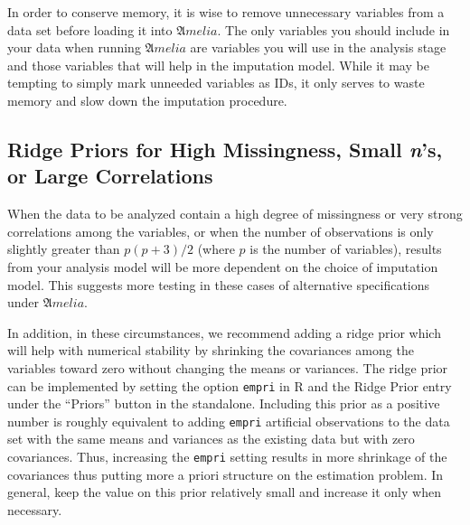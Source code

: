 \documentclass[12pt,titlepage]{article}
\begin{document}
In order to conserve memory, it is wise to remove unnecessary
variables from a data set before loading it into ${\mathfrak Amelia}$.
The only variables you should include in your data when running
${\mathfrak Amelia}$ are variables you will use in the analysis stage
and those variables that will help in the imputation model.  While it
may be tempting to simply mark unneeded variables as IDs, it only
serves to waste memory and slow down the imputation procedure.



\subsection{Ridge Priors for High Missingness, Small \emph{n}'s, or Large Correlations}
\label{sec:prior}
When the data to be analyzed contain a high degree of missingness or
very strong correlations among the variables, or when the number of
observations is only slightly greater than $p(p+3)/2$ (where $p$ is
the number of variables), results from your analysis model will be
more dependent on the choice of imputation model.  This suggests more
testing in these cases of alternative specifications under ${\mathfrak
  Amelia}$.

In addition, in these circumstances, we recommend adding a ridge prior
which will help with numerical stability by shrinking the covariances
among the variables toward zero without changing the means or
variances.  The ridge prior can be implemented by setting the option
\texttt{empri} in R and the Ridge Prior entry under the ``Priors''
button in the standalone.  Including this prior as a positive number
is roughly equivalent to adding \texttt{empri} artificial observations
to the data set with the same means and variances as the existing data
but with zero covariances.  Thus, increasing the \texttt{empri}
setting results in more shrinkage of the covariances thus putting more
a priori structure on the estimation problem.  In general, keep the
value on this prior relatively small and increase it only when
necessary.



\end{document}
